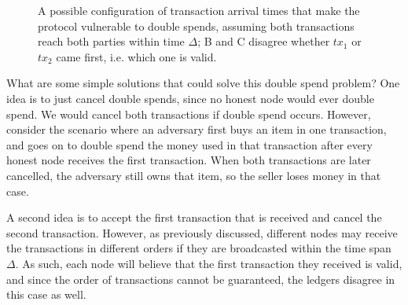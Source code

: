 \begin{figure}[h!]
\centering
{}
\caption{A possible configuration of transaction arrival times that make the protocol vulnerable to double spends, assuming both transactions reach both parties within time $\Delta$; B and C disagree whether $tx_1$ or $tx_2$ came first, i.e. which one is valid.}
\end{figure}

What are some simple solutions that could solve this double spend problem? One idea is to just cancel double spends, since no honest node would ever double spend. We would cancel both transactions if double spend occurs. However, consider the scenario where an adversary first buys an item in one transaction, and goes on to double spend the money used in that transaction after every honest node receives the first transaction. When both transactions are later cancelled, the adversary still owns that item, so the seller loses money in that case.

A second idea is to accept the first transaction that is received and cancel the second transaction. However, as previously discussed, different nodes may receive the transactions in different orders if they are broadcasted within the time span $\Delta$. As such, each node will believe that the first transaction they received is valid, and since the order of transactions cannot be guaranteed, the ledgers disagree in this case as well.

